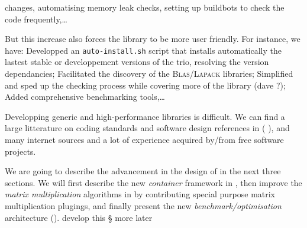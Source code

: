 changes, automatising memory leak checks, setting up buildbots to check the code
frequently,\dots
%
\par
%
But this increase also forces the library to be more user friendly. For
instance, we have:
%
Developped an \texttt{auto-install.sh} script that installs automatically the
lastest stable or developpement versions of the trio, resolving the version
dependancies;
%
Facilitated the discovery of the \textsc{Blas}/\textsc{Lapack} libraries;
%
Simplified and sped up the checking process while covering more of the library
(\danger dave ?);
%
Added comprehensive benchmarking tools,\dots
%
%
\par
%
Developping generic and high-performance libraries is difficult. We can find a
large litterature on coding standards and software design references in (\cf{}
\cite{alexandrescu:01:modern,gamma:95:design,sutter:05:cpp,stroustrup1994design,Douglas:05:GPHP}),
and many internet sources and a lot of experience acquired by/from free
software projects.
%
\par
%
We are going to describe the advancement in the design of \linbox in the next
three sections. We will first describe the new \emph{container} framework in
, then improve the \emph{matrix multiplication} algorithms
in  by contributing special purpose matrix multiplication
plugings, and finally present the new \emph{benchmark/optimisation}
architecture ().
%
\danger develop this § more later
